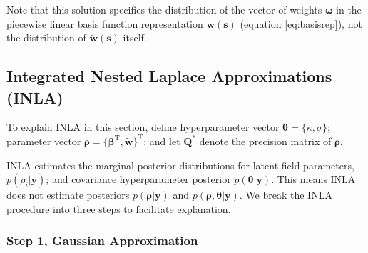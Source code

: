 Note that this solution specifies the distribution of the vector of weights $\pmb{\omega}$ in the piecewise linear basis function representation $\widetilde{\pmb{w}}(\pmb{s})$ (equation \ref{eq:basisrep}), not the distribution of $\widetilde{\pmb{w}}(\pmb{s})$ itself.

\subsection{Integrated Nested Laplace Approximations (INLA)}

To explain INLA in this section, define hyperparameter vector $\pmb{\theta} = \{\kappa, \sigma \}$; parameter vector $\pmb{\rho} = \{ \pmb{\beta}^{\text{T}}, \widetilde{\pmb{w}} \}^{\text{T}}$; and let $\pmb{Q}^{*}$ denote the precision matrix of $\pmb{\rho}$.

INLA estimates the marginal posterior distributions for latent field parameters, $p(\rho_{i}|\pmb{y})$; and covariance hyperparameter posterior $p(\pmb{\theta}|\pmb{y})$. This means INLA does not estimate posteriors $p(\pmb{\rho}|\pmb{y})$ and $p(\pmb{\rho},\pmb{\theta}|\pmb{y})$. We break the INLA procedure into three steps to facilitate explanation.

\subsubsection{Step 1, Gaussian Approximation} %


